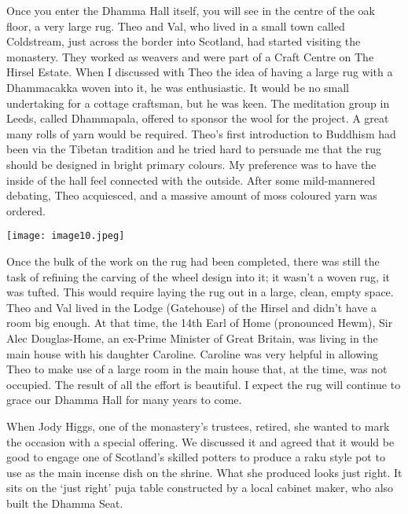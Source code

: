 Once you enter the Dhamma Hall itself, you will see in the centre of the
oak floor, a very large rug. Theo and Val, who lived in a small town
called Coldstream, just across the border into Scotland, had started
visiting the monastery. They worked as weavers and were part of a Craft
Centre on The Hirsel Estate\cite{hirsel}. When I discussed with Theo the
idea of having a large rug with a Dhammacakka woven into it, he was
enthusiastic. It would be no small undertaking for a cottage craftsman,
but he was keen. The meditation group in Leeds, called Dhammapala,
offered to sponsor the wool for the project. A great many rolls of yarn
would be required. Theo's first introduction to Buddhism had been via
the Tibetan tradition and he tried hard to persuade me that the rug
should be designed in bright primary colours. My preference was to have
the inside of the hall feel connected with the outside. After some
mild-mannered debating, Theo acquiesced, and a massive amount of moss
coloured yarn was ordered.

\texttt{[image: image10.jpeg]}

Once the bulk of the work on the rug had been completed, there was still
the task of refining the carving of the wheel design into it; it wasn't
a woven rug, it was tufted. This would require laying the rug out in a
large, clean, empty space. Theo and Val lived in the Lodge (Gatehouse)
of the Hirsel and didn't have a room big enough. At that time, the
14th Earl of Home\cite{earl} (pronounced Hewm), Sir Alec Douglas-Home, an ex-Prime
Minister of Great Britain, was living in the main house with his
daughter Caroline. Caroline was very helpful in allowing Theo to make
use of a large room in the main house that, at the time, was not
occupied. The result of all the effort is beautiful. I expect the rug
will continue to grace our Dhamma Hall for many years to come.

When Jody Higgs, one of the monastery's trustees, retired, she wanted to
mark the occasion with a special offering. We discussed it and agreed
that it would be good to engage one of Scotland's skilled potters to
produce a raku\cite{raku} style pot to use as the main incense dish
on the shrine. What
she produced looks just right. It sits on the `just right' puja table
constructed by a local cabinet maker, who also built the Dhamma Seat.

